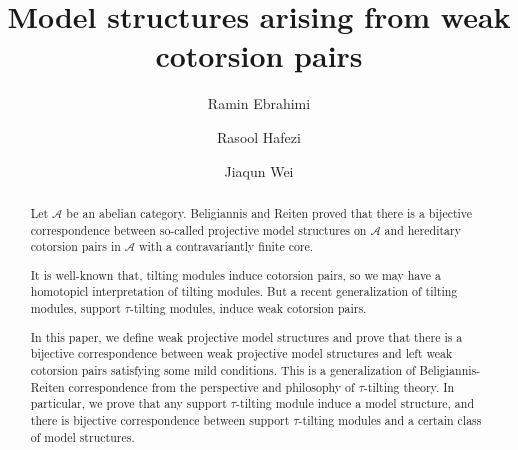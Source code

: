 \documentclass[12pt]{amsart}
\numberwithin{equation}{section}
\theoremstyle{definition}
\newtheorem*{theorem 0*}{Theorem}
\newtheorem*{theorem a*}{Theorem A}
\newtheorem*{theorem b*}{Theorem B}
\numberwithin{diagram}{section}
\begin{document}
	
	\title{Model structures arising from weak cotorsion pairs}
	
	\author{Ramin Ebrahimi}
	\address{School of Mathematical Sciences, Zhejiang Normal University, Jinhua 321004, China\\ and School of Mathematics, Institute for Research in Fundamental Sciences (IPM), P.O. Box: 19395-5746, Tehran, Iran}
	
	\author{Rasool Hafezi}
	\address{School of Mathematics and Statistics, Nanjing University of Information Science and Technology, Nanjing, Jiangsu 210044, P.R. China}

\author{Jiaqun Wei}
	\address{School of Mathematical Science, Zhejiang Normal University, Jinhua 321004, China}
	
	
	
	
	
	\begin{abstract}
		Let $\mathcal{A}$ be an abelian category.
		Beligiannis and Reiten proved that there is a bijective correspondence between so-called projective model structures on $\mathcal{A}$ and hereditary cotorsion pairs in $\mathcal{A}$ with a contravariantly finite core. 
		
		It is well-known that, tilting modules induce cotorsion pairs, so we may have a homotopicl interpretation of tilting modules. But a recent generalization of tilting modules, support $\tau$-tilting modules, induce weak cotorsion pairs.
		
		In this paper, we define weak projective model structures and prove that there is a bijective correspondence between weak projective model structures and left weak cotorsion pairs satisfying some mild conditions. This is a generalization of Beligiannis-Reiten correspondence from the perspective and philosophy of $\tau$-tilting theory. In particular, we prove that any support $\tau$-tilting module induce a model structure, and there is bijective correspondence between support $\tau$-tilting modules and a certain class of model structures.
	\end{abstract}
	
	\maketitle
	
\end{document}
